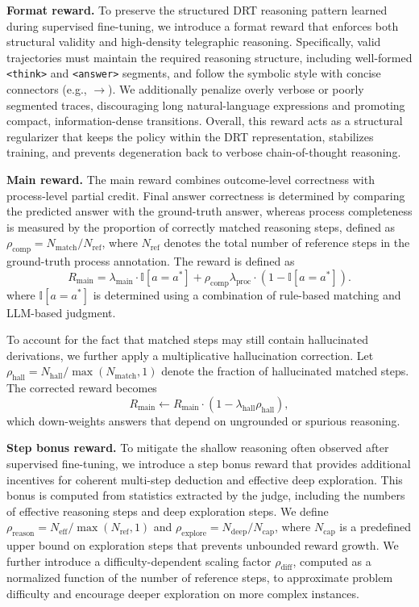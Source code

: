 \noindent\textbf{Format reward.}
To preserve the structured DRT reasoning pattern learned during supervised fine-tuning, we introduce a format reward that enforces both structural validity and high-density telegraphic reasoning. Specifically, valid trajectories must maintain the required reasoning structure, including well-formed \texttt{<think>} and \texttt{<answer>} segments, and follow the symbolic style with concise connectors (e.g., $\rightarrow$). We additionally penalize overly verbose or poorly segmented traces, discouraging long natural-language expressions and promoting compact, information-dense transitions. Overall, this reward acts as a structural regularizer that keeps the policy within the DRT representation, stabilizes training, and prevents degeneration back to verbose chain-of-thought reasoning.

\noindent\textbf{Main reward.}
The main reward combines outcome-level correctness with process-level partial credit. Final answer correctness is determined by comparing the predicted answer with the ground-truth answer, whereas process completeness is measured by the proportion of correctly matched reasoning steps, defined as $\rho_{\text{comp}} = N_{\text{match}} / N_{\text{ref}}$, where $N_{\text{ref}}$ denotes the total number of reference steps in the ground-truth process annotation. The reward is defined as
\[
R_{\text{main}} = \lambda_{\text{main}} \cdot \mathbb{I}[a = a^{*}] + \rho_{\text{comp}}\lambda_{\text{proc}} \cdot (1 - \mathbb{I}[a = a^{*}]).
\]
where $\mathbb{I}[a = a^{*}]$ is determined using a combination of rule-based matching and LLM-based judgment.

To account for the fact that matched steps may still contain hallucinated derivations, we further apply a multiplicative hallucination correction. Let $\rho_{\text{hall}} = N_{\text{hall}} / \max(N_{\text{match}}, 1)$ denote the fraction of hallucinated matched steps. The corrected reward becomes
\[
R_{\text{main}} \leftarrow R_{\text{main}} \cdot (1 - \lambda_{\text{hall}}\rho_{\text{hall}}),
\]
which down-weights answers that depend on ungrounded or spurious reasoning.

\noindent\textbf{Step bonus reward.}
To mitigate the shallow reasoning often observed after supervised fine-tuning, we introduce a step bonus reward that provides additional incentives for coherent multi-step deduction and effective deep exploration. This bonus is computed from statistics extracted by the judge, including the numbers of effective reasoning steps and deep exploration steps. We define $\rho_{\text{reason}} = N_{\text{eff}} / \max(N_{\text{ref}}, 1)$ and $\rho_{\text{explore}} = N_{\text{deep}} / N_{\text{cap}}$, where $N_{\text{cap}}$ is a predefined upper bound on exploration steps that prevents unbounded reward growth. We further introduce a difficulty-dependent scaling factor $\rho_{\text{diff}}$, computed as a normalized function of the number of reference steps, to approximate problem difficulty and encourage deeper exploration on more complex instances.

